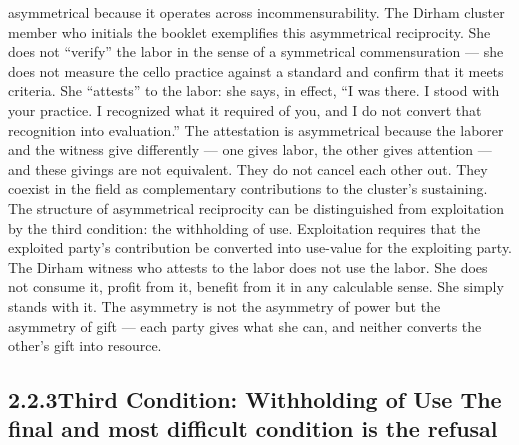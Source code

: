 asymmetrical because it operates across incommensurability. The Dirham cluster member who initials the booklet exemplifies this asymmetrical reciprocity. She does not “verify” the labor in the sense of a symmetrical commensuration — she does not measure the cello practice against a standard and confirm that it meets criteria. She “attests” to the labor: she says, in effect, “I was there. I stood with your practice. I recognized what it required of you, and I do not convert that recognition into evaluation.” The attestation is asymmetrical because the laborer and the witness give differently — one gives labor, the other gives attention — and these givings are not equivalent. They do not cancel each other out. They coexist in the field as complementary contributions to the cluster’s sustaining. The structure of asymmetrical reciprocity can be distinguished from exploitation by the third condition: the withholding of use. Exploitation requires that the exploited party’s contribution be converted into use-value for the exploiting party. The Dirham witness who attests to the labor does not use the labor. She does not consume it, profit from it, benefit from it in any calculable sense. She simply stands with it. The asymmetry is not the asymmetry of power but the asymmetry of gift — each party gives what she can, and neither converts the other’s gift into resource.

\subsection{2.2.3\quad Third Condition: Withholding of Use The final and most difficult condition is the refusal}

